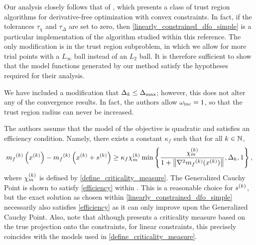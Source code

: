 \documentclass{article}
\begin{document}
Our analysis closely follows that of \cite{Conejo:2013:GCT:2620806.2621814},
which presents a class of trust region algorithms for derivative-free optimization with convex constraints.
In fact, if the tolerances $\tau_{\chi}$ and $\tau_{\Delta}$ are set to zero,  
then \cref{linearly_constrained_dfo_simple} is a particular implementation of the algorithm studied within this reference.
The only modification is in the trust region subproblem, in which we allow for more trial points with a $L_{\infty}$ ball instead of an $L_2$ ball.
It is therefore sufficient to show that the model functions generated by our method satisfy the hypotheses required for their analysis.

We have included a modification that $\Delta_k \le {\Delta_{\textrm{max}}}$; however, this does not alter any of the convergence results.
In fact, the authors allow $\omega_{\text{inc}} = 1$, so that the trust region radius can never be increased.

The authors assume that the model of the objective is quadratic and satisfies an efficiency condition.
Namely, there exists a constant $\kappa_f$ such that for all $k \in \mathbb N$,
\begin{align}
\label{efficiency}
{{m}_f}^{(k)}\left(x^{(k)}\right) - {{m}_f}^{(k)}\left(x^{(k)} + {{s}^{(k)}}\right) \ge \kappa_f {\chi_m^{(k)}} \min\left\{ \frac{{\chi_m^{(k)}}}{1+\left\|\nabla^2 {{m}_f}^{(k)}(x^{(k)})\right\|}, \Delta_k, 1 \right\},
\end{align}
where ${\chi_m^{(k)}}$ is defined by \cref{define_criticality_measure}.
The Generalized Cauchy Point is shown to satisfy \cref{efficiency} within \cite{Conn:2000:TM:357813}.
This is a reasonable choice for ${{s}^{(k)}}$, but the exact solution as chosen within \cref{linearly_constrained_dfo_simple} 
necessarily also satisfies \cref{efficiency} as it can only improve upon the Generalized Cauchy Point.
Also, note that although \cite{Conejo:2013:GCT:2620806.2621814} presents a criticality measure based on the true projection onto the constraints,
for linear constraints, this precisely coincides with the models used in \cref{define_criticality_measure}.
\end{document}
